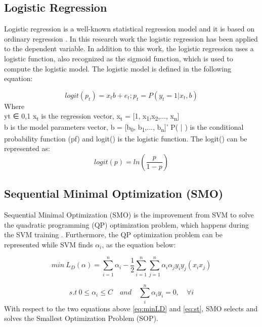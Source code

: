 \documentclass[review]{elsarticle}
\begin{document}
\subsection{Logistic Regression}
\label{subsec:Logistic}
Logistic regression is a well-known statistical regression model and it is based on ordinary regression \cite{Wilson2015}. In this research work the logistic regression has been applied to the dependent variable. In addition to this work, the logistic regression uses a logistic function, also recognized as the sigmoid function, which is used to compute the logistic model. The logistic model is defined in the following equation:
	
 	\begin{equation}
 	logit(p_t) =x_tb+e_t; p_t=P(y_t =1|x_t,b)
 	\label{eq:logit_PT}
 	\end{equation}
 	Where \\
 	yt ∈ {0,1} 
 	x\textsubscript{t} is the regression vector, x\textsubscript{t} = [1, x\textsubscript{1},x\textsubscript{2},..., x\textsubscript{n}]\\
 	b is the model parameters vector, b = [b\textsubscript{0}, b\textsubscript{1},..., b\textsubscript{n}]’
 	P( | )  is the conditional probability function (pf) and 
 	logit() is the logistic function. The logit() can be represented as: 
 	\begin{equation}
 	logit(p)=ln(\dfrac{p}{1-p})
 	\label{eq:logit_P}
 	\end{equation}
	
\subsection{Sequential Minimal Optimization (SMO)}
\label{subsec:SMO}
Sequential Minimal Optimization (SMO) is the improvement from SVM to solve the quadratic programming (QP) optimization problem, which happens during the SVM training \cite{Platt1998}. Furthermore, the QP optimization problem can be represented while SVM finds $\alpha_i$, as the equation below:

 	\begin{equation}
 	min \ L_D(\alpha)= \sum_{i=1}^n \alpha_i -\dfrac{1}{2}\sum_{i=1}^n \sum_{j=1}^n \alpha_i \alpha_j y_iy_j(x_ix_j)
 	\label{eq:minLD}
 	\end{equation}
 	
 	\begin{equation}
 	s.t \ 0 \leq \alpha_i \leq C \quad  and \quad \sum_i^n \alpha_i y_i =0, \quad \forall i
    \label{eq:st}
 	\end{equation}
 	With respect to the two equations above \ref{eq:minLD} and \ref{eq:st}, SMO selects and solves the Smallest Optimization Problem (SOP).
	
\end{document}
